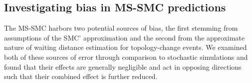 \documentclass[11pt]{article}
\begin{document}








\subsection{Investigating bias in MS-SMC predictions}
The MS-SMC harbors two potential sources of bias, the first stemming from 
assumptions of the SMC' approximation and the second from the approximate 
nature of waiting distance estimation for topology-change events. We examined 
both of these sources of error through comparison to stochastic simulations 
and found that their effects are generally negligible and act in opposing 
directions such that their combined effect is further reduced.
\end{document}
